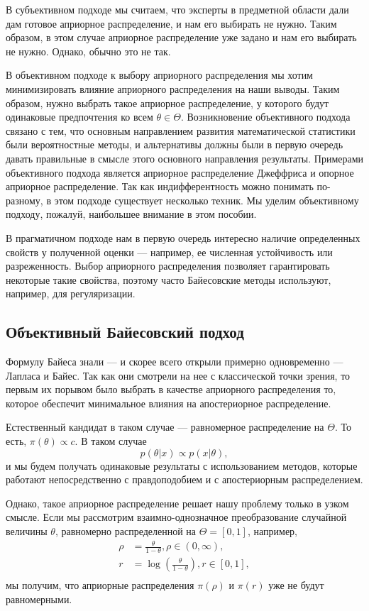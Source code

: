 В субъективном подходе мы считаем, что эксперты в предметной области дали дам готовое априорное распределение, и нам его выбирать не нужно.
Таким образом, в этом случае априорное распределение уже задано и нам его выбирать не нужно.
Однако, обычно это не так.

В объективном подходе к выбору априорного распределения мы хотим минимизировать влияние априорного распределения
на наши выводы.
Таким образом, нужно выбрать такое априорное распределение, у которого будут одинаковые предпочтения ко всем $\theta \in \Theta$.
Возникновение объективного подхода связано с тем, что основным направлением развития математической статистики 
были вероятностные методы, и альтернативы должны были в первую очередь давать правильные в смысле этого основного направления результаты.
Примерами объективного подхода является априорное распределение Джеффриса и опорное априорное распределение.
Так как индифферентность можно понимать по-разному, в этом подходе существует несколько техник.
Мы уделим объективному подходу, пожалуй, наибольшее внимание в этом пособии.

В прагматичном подходе нам в первую очередь интересно наличие определенных свойств у полученной оценки --- 
например, ее численная устойчивость или разреженность.
Выбор априорного распределения позволяет гарантировать некоторые такие свойства,
поэтому часто Байесовские методы используют, например, для регуляризации.

\subsection{Объективный Байесовский подход}
\label{sec:objective_intro}

Формулу Байеса знали --- и скорее всего открыли примерно одновременно --- Лапласа и Байес. 
Так как они смотрели на нее с классической точки зрения,
то первым их порывом было выбрать в качестве априорного распределения то, 
которое обеспечит минимальное влияния на апостериорное распределение.

Естественный кандидат в таком случае --- равномерное распределение на $\Theta$.
То есть, $\pi(\theta) \propto c$.
В таком случае 
\[
p(\theta | x) \propto p(x | \theta),
\]
и мы будем получать одинаковые результаты с использованием методов, которые работают непосредственно с правдоподобием и с апостериорным распределением.

Однако, такое априорное распределение решает нашу проблему только в узком смысле.
Если мы рассмотрим взаимно-однозначное преобразование случайной величины $\theta$, равномерно распределенной на $\Theta = [0, 1]$, например,
\begin{align*}
\rho &= \frac{\theta}{1 - \theta}, \rho \in (0, \infty), \\
   r &= \log \left( \frac{\theta}{1 - \theta} \right), r \in [0, 1], \\
\end{align*}
мы получим, что априорные распределения $\pi(\rho)$ и $\pi(r)$ уже не будут равномерными.

